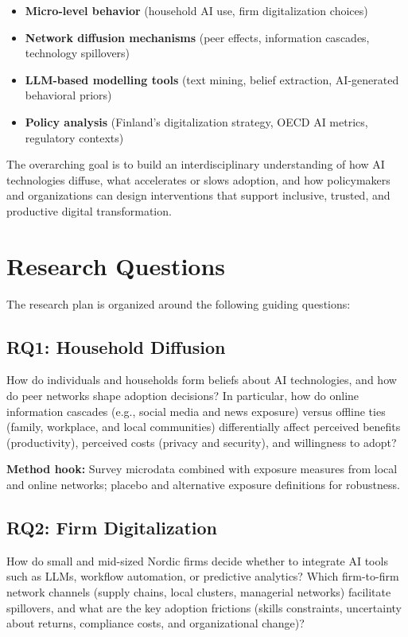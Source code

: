 \documentclass{nfr}
\begin{document}
\begin{itemize}
\item \textbf{Micro-level behavior} (household AI use, firm digitalization choices)
\item \textbf{Network diffusion mechanisms} (peer effects, information cascades, technology spillovers)
\item \textbf{LLM-based modelling tools} (text mining, belief extraction, AI-generated behavioral priors)
\item \textbf{Policy analysis} (Finland’s digitalization strategy, OECD AI metrics, regulatory contexts)
\end{itemize}

The overarching goal is to build an interdisciplinary understanding of how AI technologies diffuse, what accelerates or slows adoption, and how policymakers and organizations can design interventions that support inclusive, trusted, and productive digital transformation.

\section{Research Questions}

The research plan is organized around the following guiding questions:

\subsection*{RQ1: Household Diffusion}

How do individuals and households form beliefs about AI technologies, and how do peer networks shape adoption decisions? In particular, how do online information cascades (e.g., social media and news exposure) versus offline ties (family, workplace, and local communities) differentially affect perceived benefits (productivity), perceived costs (privacy and security), and willingness to adopt?

\noindent \textbf{Method hook:} Survey microdata combined with exposure measures from local and online networks; placebo and alternative exposure definitions for robustness.

\subsection*{RQ2: Firm Digitalization}

How do small and mid-sized Nordic firms decide whether to integrate AI tools such as LLMs, workflow automation, or predictive analytics? Which firm-to-firm network channels (supply chains, local clusters, managerial networks) facilitate spillovers, and what are the key adoption frictions (skills constraints, uncertainty about returns, compliance costs, and organizational change)?
\end{document}
